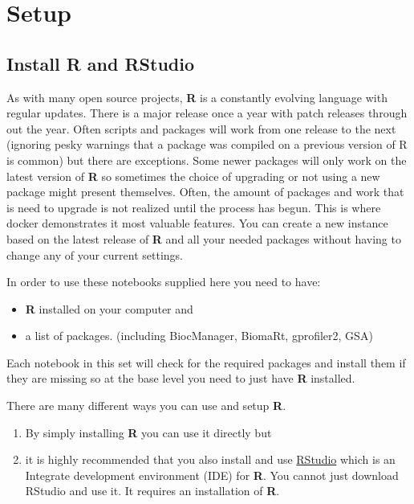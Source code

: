 \documentclass[
]{book}
\providecommand{\tightlist}{%
  \setlength{\itemsep}{0pt}\setlength{\parskip}{0pt}}
\begin{document}
\hypertarget{setup}{%
\chapter{Setup}\label{setup}}

\hypertarget{install-r-and-rstudio}{%
\section{Install R and RStudio}\label{install-r-and-rstudio}}

As with many open source projects, \textbf{R} is a constantly evolving language with regular updates. There is a major release once a year with patch releases through out the year. Often scripts and packages will work from one release to the next (ignoring pesky warnings that a package was compiled on a previous version of R is common) but there are exceptions. Some newer packages will only work on the latest version of \textbf{R} so sometimes the choice of upgrading or not using a new package might present themselves. Often, the amount of packages and work that is need to upgrade is not realized until the process has begun. This is where docker demonstrates it most valuable features. You can create a new instance based on the latest release of \textbf{R} and all your needed packages without having to change any of your current settings.

In order to use these notebooks supplied here you need to have:

\begin{itemize}
\tightlist
\item
  \textbf{R} installed on your computer and
\item
  a list of packages. (including BiocManager, BiomaRt, gprofiler2, GSA)
\end{itemize}

Each notebook in this set will check for the required packages and install them if they are missing so at the base level you need to just have \textbf{R} installed.

There are many different ways you can use and setup \textbf{R}.

\begin{enumerate}
\def\labelenumi{\arabic{enumi}.}
\tightlist
\item
  By simply installing \textbf{R} you can use it directly but
\item
  it is highly recommended that you also install and use \href{https://rstudio.com/products/rstudio/download/}{RStudio} which is an Integrate development environment (IDE) for \textbf{R}. You cannot just download RStudio and use it. It requires an installation of \textbf{R}.
\end{enumerate}
\end{document}
